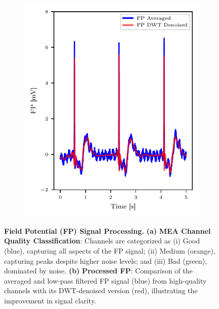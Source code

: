 \documentclass{report}
\begin{document}
\begin{figure}[H]
\begin{subfigure}[b]{0.45\textwidth}
                   \includegraphics[width=\textwidth, keepaspectratio]{plots/chapter_3/mea_avg_filtered_preprocessed_plot.pdf}
                    \caption[Processed field potential]{}
                    \label{fig:mea-final}
                \end{subfigure}
                \caption[Field Potential Signal Processing]{\textbf{Field Potential (FP) Signal Processing.} \textbf{(a)} \textbf{MEA Channel Quality Classification}: Channels are categorized as (i) Good (blue), capturing all aspects of the FP signal; (ii) Medium (orange), capturing peaks despite higher noise levels; and (iii) Bad (green), dominated by noise. \textbf{(b)} \textbf{Processed FP}: Comparison of the averaged and low-pass filtered FP signal (blue) from high-quality channels with its DWT-denoised version (red), illustrating the improvement in signal clarity.}
    \end{figure}
    
\end{document}
